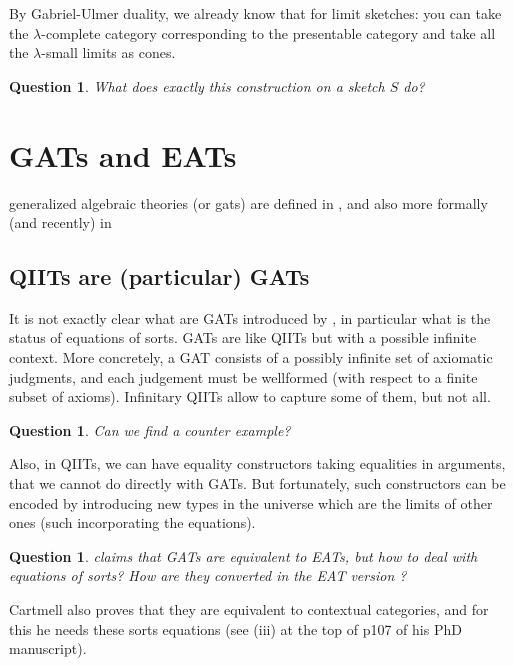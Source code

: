 \documentclass{article}
\newcommand{\Set}{\text{Set}}
\newtheorem{question}[theorem]{Question}
\begin{document}
By Gabriel-Ulmer duality, we already know that for limit sketches: you can
take the $\lambda$-complete category corresponding to the presentable category
and take all the $\lambda$-small limits as cones.
\begin{question}
 What does exactly this construction on a sketch $S$ do? 
\end{question}
\section{GATs and EATs}
generalized algebraic theories (or gats) are defined in \cite{CARTMELL}, and
also more formally (and recently) in \cite{combinatorial-structure}


\subsection{QIITs are (particular) GATs}
It is not exactly clear what are GATs introduced by \cite{CARTMELL}, in particular what is the status of
equations of sorts.
GATs are like QIITs but with a possible infinite context. More concretely, a GAT
consists of a possibly infinite set of axiomatic judgments, and each judgement must be
wellformed (with respect to a finite subset of axioms).
Infinitary QIITs allow to capture some of them, but not all.
\begin{question}
Can we find a
counter example?
\end{question}

Also, in QIITs, we can have equality constructors taking equalities in
arguments, that we cannot do directly with GATs. But fortunately, such constructors can be encoded
by introducing new types in the universe which are the limits of other ones
(such incorporating the equations).
\begin{question}
\cite{CARTMELL}  claims that GATs are equivalent to EATs, but how to deal with
equations of sorts? How are they converted in the EAT version ?
\end{question}
Cartmell also proves
that they are equivalent to contextual categories, and for this he needs these
sorts equations
(see (iii) at the
top of p107 of his PhD manuscript).
\end{document}
